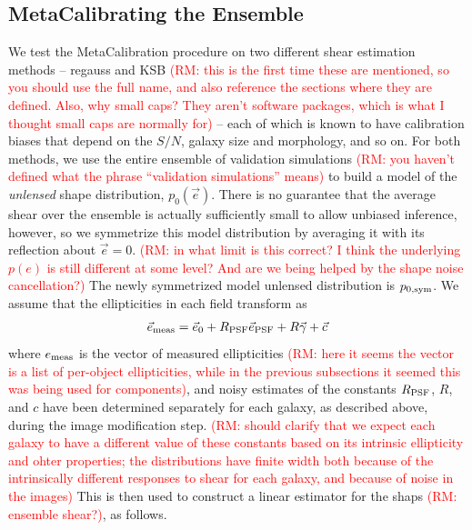 \documentclass[iop]{emulateapj}
\newcommand\rmcomment[1]{\textcolor{red}{(RM: #1)}}
\begin{document}
\subsection{MetaCalibrating the Ensemble}
We test the MetaCalibration procedure on two different shear
estimation methods -- {\sc regauss} and {\sc KSB} \rmcomment{this is the first time these are
  mentioned, so you should use the full name, and also reference the sections where they are
  defined.  Also, why small caps?  They aren't software packages, which is what I thought small caps
  are normally for} -- each of which is known to have calibration biases that depend on the $S/N$,
galaxy size and morphology, and so on. For both methods, we use the entire
ensemble of validation simulations \rmcomment{you haven't defined what the phrase ``validation
  simulations'' means} to build a model of the {\it
  unlensed} shape distribution, $p_0(\vec{e})$. There is no guarantee
that the average shear over the ensemble is actually sufficiently
small to allow unbiased inference, however, so we symmetrize this
model distribution by averaging it with its reflection about
$\vec{e}=0$. \rmcomment{in what limit is this correct?  I think the underlying $p(e)$ is still
  different at some level?  And are we being helped by the shape noise cancellation?}  
The newly symmetrized model unlensed distribution is
$p_{0,\rm sym}$. We assume that the ellipticities in each field
transform as
\begin{align}
\vec{e}_{\rm meas} = \vec{e}_{0} + R_{\rm PSF} \vec{e}_{\rm PSF} + R\vec{\gamma} + \vec{c}
\label{eqn:edist_model}
\end{align}
where $e_{\rm meas}$ is the vector of measured ellipticities \rmcomment{here it seems the vector is
  a list of per-object ellipticities, while in the previous subsections it seemed this was being
  used for components}, and noisy estimates of the
constants $R_{\rm PSF}$, $R$, and $c$ have been determined separately
for each galaxy, as described above, during the image modification
step. \rmcomment{should clarify that we expect each galaxy to have a different value of these
  constants based on its intrinsic ellipticity and ohter properties; the distributions have finite
  width both because of the intrinsically different responses to shear for each galaxy, and because
  of noise in the images} This is then used to construct a linear estimator for the
shaps \rmcomment{ensemble shear?}, as follows.
\end{document}
